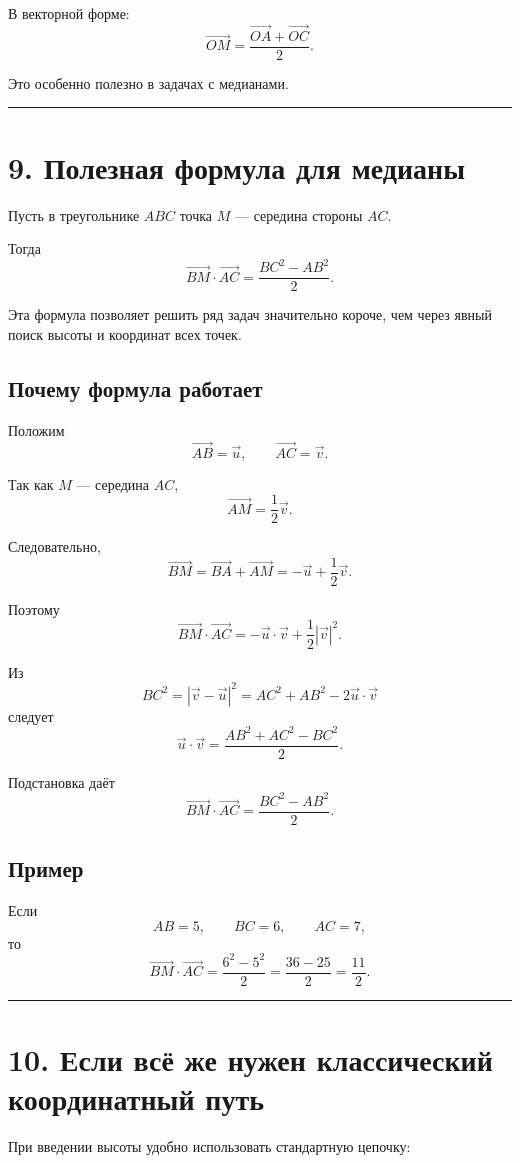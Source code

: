\documentclass[a4paper,12pt]{article}
\newcommand{\vect}[1]{\overrightarrow{#1}}
\newcommand{\vct}[1]{\vec{#1}}
\newcommand{\sectionline}{%
    \par\noindent
    {\color{linegray}\rule{\linewidth}{0.5pt}}
    \par
}
\begin{document}
В векторной форме:
\[
\vct{OM}
=
\frac{\vct{OA}+\vct{OC}}{2}.
\]

Это особенно полезно в задачах с медианами.

\sectionline

\section*{\color{darkaccent}9. Полезная формула для медианы}

Пусть в треугольнике $ABC$ точка $M$ --- середина стороны $AC$.

Тогда
\[
\boxed{
\vect{BM}\cdot\vect{AC}
=
\frac{BC^2-AB^2}{2}
}.
\]

Эта формула позволяет решить ряд задач значительно короче, чем
через явный поиск высоты и координат всех точек.

\subsection*{\color{accent}Почему формула работает}

Положим
\[
\vect{AB}=\vct u,
\qquad
\vect{AC}=\vct v.
\]

Так как $M$ --- середина $AC$,
\[
\vect{AM}=\frac12\vct v.
\]

Следовательно,
\[
\vect{BM}
=
\vect{BA}+\vect{AM}
=
-\vct u+\frac12\vct v.
\]

Поэтому
\[
\vect{BM}\cdot\vect{AC}
=
-\vct u\cdot\vct v+\frac12|\vct v|^2.
\]

Из
\[
BC^2
=
|\vct v-\vct u|^2
=
AC^2+AB^2-2\vct u\cdot\vct v
\]
следует
\[
\vct u\cdot\vct v
=
\frac{AB^2+AC^2-BC^2}{2}.
\]

Подстановка даёт
\[
\vect{BM}\cdot\vect{AC}
=
\frac{BC^2-AB^2}{2}.
\]

\subsection*{\color{accent}Пример}

Если
\[
AB=5,\qquad BC=6,\qquad AC=7,
\]
то
\[
\vect{BM}\cdot\vect{AC}
=
\frac{6^2-5^2}{2}
=
\frac{36-25}{2}
=
\boxed{\frac{11}{2}}.
\]

\sectionline

\section*{\color{darkaccent}10. Если всё же нужен классический координатный путь}

При введении высоты удобно использовать стандартную цепочку:
\end{document}
